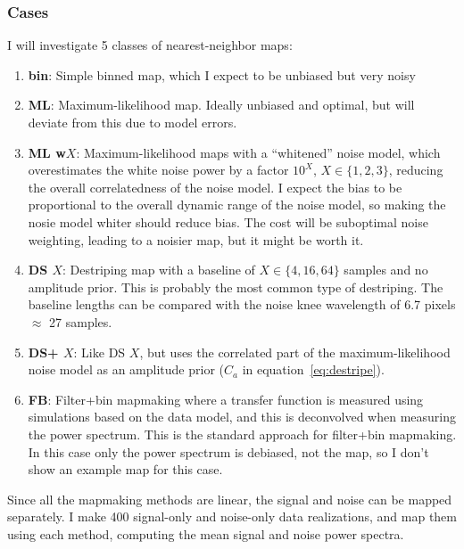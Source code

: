 \documentclass[twocolumn,apj]{aastex63}
\newcommand{\dfn}[1]{\textbf{#1}}
\begin{document}
\subsubsection{Cases}
\label{sec:2d-cases}
I will investigate 5 classes of nearest-neighbor maps:
\begin{enumerate}
	\item \dfn{bin}: Simple binned map, which I expect to be unbiased but very noisy
	\item \dfn{ML}: Maximum-likelihood map. Ideally unbiased and optimal, but will deviate
		from this due to model errors.
	\item \dfn{ML w$X$}: Maximum-likelihood maps with a ``whitened'' noise model,
		which overestimates the
		white noise power by a factor $10^X$, $X\in\{1,2,3\}$, reducing the overall
		correlatedness of the noise model. I expect the bias to be proportional to the
		overall dynamic range of the noise model,
		so making the nosie model whiter should reduce bias. The cost will be suboptimal noise
		weighting, leading to a noisier map, but it might be worth it.
	\item \dfn{DS $X$}: Destriping map with a baseline of $X\in \{4,16,64\}$ samples and no amplitude
		prior. This is probably the most common type of destriping. The baseline lengths
		can be compared with the noise knee wavelength of 6.7 pixels $\approx$ 27 samples.
	\item \dfn{DS+ $X$}: Like DS $X$, but uses the correlated part of the maximum-likelihood
		noise model as an amplitude prior ($C_a$ in equation~\ref{eq:destripe}).
	\item \dfn{FB}: Filter+bin mapmaking where a transfer function is measured using
		simulations based on the data model, and this is deconvolved when measuring
		the power spectrum. This is the standard approach for filter+bin mapmaking.
		In this case only the power spectrum is debiased, not the map, so I don't
		show an example map for this case.
\end{enumerate}

Since all the mapmaking methods are linear, the signal and noise can be mapped separately.
I make 400 signal-only and noise-only data realizations, and map them using each method,
computing the mean signal and noise power spectra.
\end{document}
